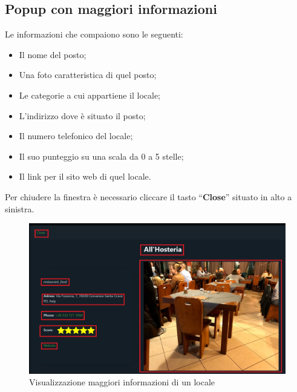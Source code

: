 {{    }

    \subsection{Popup con maggiori informazioni} {
        Le informazioni che compaiono sono le seguenti:
        \begin{itemize}
            \item Il nome del posto;
            \item Una foto caratteristica di quel posto;
            \item Le categorie a cui appartiene il locale;
            \item L'indirizzo dove è situato il posto;
            \item Il numero telefonico del locale;
            \item Il suo punteggio su una scala da 0 a 5 stelle;
            \item Il link per il sito web di quel locale.
        \end{itemize}

        Per chiudere la finestra è necessario cliccare il tasto ``\textbf{Close}'' situato in alto a sinistra.
        \begin{figure}[H]
            \includegraphics[width=12cm]{sezioni/images/popup.png}
            \centering
            \caption{Visualizzazione maggiori informazioni di un locale}
        \end{figure}
        }
}
